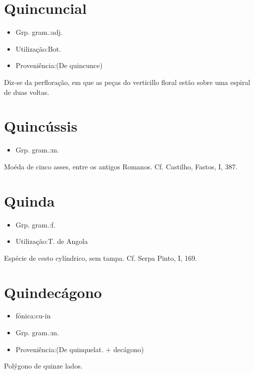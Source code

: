 \section{Quincuncial}
\begin{itemize}
\item {Grp. gram.:adj.}
\end{itemize}
\begin{itemize}
\item {Utilização:Bot.}
\end{itemize}
\begin{itemize}
\item {Proveniência:(De \textunderscore quincunce\textunderscore )}
\end{itemize}
Diz-se da perfloração, em que as peças do verticillo floral estão sobre uma espiral de duas voltas.
\section{Quincússis}
\begin{itemize}
\item {Grp. gram.:m.}
\end{itemize}
Moéda de cinco asses, entre os antigos Romanos. Cf. Castilho, \textunderscore Fastos\textunderscore , I, 387.
\section{Quinda}
\begin{itemize}
\item {Grp. gram.:f.}
\end{itemize}
\begin{itemize}
\item {Utilização:T. de Angola}
\end{itemize}
Espécie de cesto cylíndrico, sem tampa. Cf. Serpa Pinto, I, 169.
\section{Quindecágono}
\begin{itemize}
\item {fónica:cu-in}
\end{itemize}
\begin{itemize}
\item {Grp. gram.:m.}
\end{itemize}
\begin{itemize}
\item {Proveniência:(De \textunderscore quinque\textunderscore  lat. + \textunderscore decágono\textunderscore )}
\end{itemize}
Polýgono de quinze lados.
